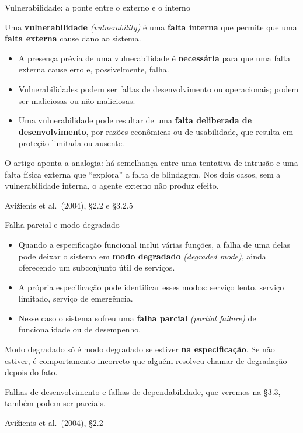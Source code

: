 \documentclass{beamer}
\newcommand{\en}[1]{{\color{depCinza}\textit{#1}}}
\newcommand{\sect}[1]{\par\smallskip\hfill{\tiny\color{black!55}Avi\v{z}ienis et al.\ (2004), #1}}
\begin{document}
\begin{frame}{Vulnerabilidade: a ponte entre o externo e o interno}
    \footnotesize
    \begin{defi}
        \scriptsize
        Uma \textbf{vulnerabilidade} \en{(vulnerability)} \'e uma \textbf{falta interna} que permite que uma \textbf{falta externa} cause dano ao sistema.
    \end{defi}
    \medskip
    \begin{itemize}
        \item A presen\c{c}a pr\'evia de uma vulnerabilidade \'e \textbf{necess\'aria} para que uma falta externa cause erro e, possivelmente, falha.
        \item Vulnerabilidades podem ser faltas de desenvolvimento ou operacionais; podem ser maliciosas ou n\~ao maliciosas.
        \item Uma vulnerabilidade pode resultar de uma \textbf{falta deliberada de desenvolvimento}, por raz\~oes econ\^omicas ou de usabilidade, que resulta em prote\c{c}\~ao limitada ou ausente.
    \end{itemize}
    \medskip
    \begin{pratica}
        \scriptsize
        O artigo aponta a analogia: h\'a semelhan\c{c}a entre uma tentativa de intrus\~ao e uma falta f\'isica externa que ``explora'' a falta de blindagem. Nos dois casos, sem a vulnerabilidade interna, o agente externo n\~ao produz efeito.
    \end{pratica}
    \sect{\S2.2 e \S3.2.5}
\end{frame}

\begin{frame}{Falha parcial e modo degradado}
    \footnotesize
    \begin{itemize}
        \item Quando a especifica\c{c}\~ao funcional inclui v\'arias fun\c{c}\~oes, a falha de uma delas pode deixar o sistema em \textbf{modo degradado} \en{(degraded mode)}, ainda oferecendo um subconjunto \'util de servi\c{c}os.
        \item A pr\'opria especifica\c{c}\~ao pode identificar esses modos: servi\c{c}o lento, servi\c{c}o limitado, servi\c{c}o de emerg\^encia.
        \item Nesse caso o sistema sofreu uma \textbf{falha parcial} \en{(partial failure)} de funcionalidade ou de desempenho.
    \end{itemize}
    \medskip
    \begin{ancora}
        \footnotesize
        Modo degradado s\'o \'e modo degradado se estiver \textbf{na especifica\c{c}\~ao}. Se n\~ao estiver, \'e comportamento incorreto que algu\'em resolveu chamar de degrada\c{c}\~ao depois do fato.
    \end{ancora}
    \medskip
    \begin{pratica}
        \scriptsize
        Falhas de desenvolvimento e falhas de dependabilidade, que veremos na \S3.3, tamb\'em podem ser parciais.
    \end{pratica}
    \sect{\S2.2}
\end{frame}
\end{document}
